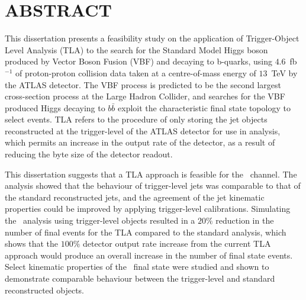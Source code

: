\chapter*{ABSTRACT}


This dissertation presents a feasibility study on the application of Trigger-Object Level Analysis (TLA) to the search for the Standard Model Higgs boson produced by Vector Boson Fusion (VBF) and decaying to b-quarks, using $4.6$~fb$^{-1}$ of proton-proton collision data taken at a centre-of-mass energy of $13$~TeV by the ATLAS detector. The VBF process is predicted to be the second largest cross-section process at the Large Hadron Collider, and searches for the VBF produced Higgs decaying to $b\bar{b}$ exploit the characteristic final state topology to select events. TLA refers to the procedure of only storing the jet objects reconstructed at the trigger-level of the ATLAS detector for use in analysis, which permits an increase in the output rate of the detector, as a result of reducing the byte size of the detector readout.

This dissertation suggests that a TLA approach is feasible for the \VBFHBB\ channel. The analysis showed that the behaviour of trigger-level jets was comparable to that of the standard reconstructed jets, and the agreement of the jet kinematic properties     could be improved by applying trigger-level calibrations. Simulating the \VBFHBB\ analysis using trigger-level objects resulted in a $20\%$ reduction in the number of final events for the TLA compared to the standard analysis, which shows that the $100\%$ detector output rate increase from the current TLA approach would produce an overall increase in the number of final state events. Select kinematic properties of the \VBFHBB\ final state were studied and shown to demonstrate comparable behaviour between the trigger-level and standard reconstructed objects.

\cleardoublepage

\endinput
